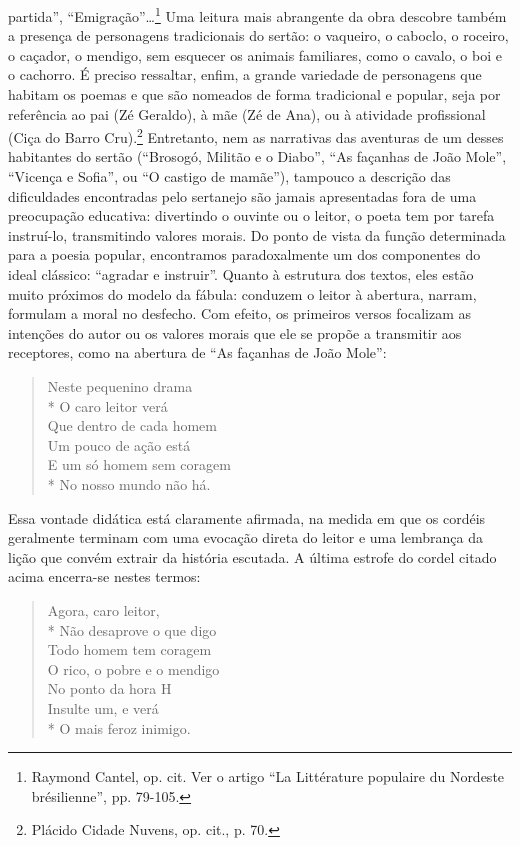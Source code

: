 partida”, “Emigração”\ldots{}\footnote{ Raymond Cantel, op. cit. Ver o artigo
“La Littérature populaire du Nordeste brésilienne”, pp. 79-105.} Uma
leitura mais abrangente da obra descobre também a presença de personagens
tradicionais do sertão: o vaqueiro, o caboclo, o roceiro, o caçador, o mendigo,
sem esquecer os animais familiares, como o cavalo, o boi e o cachorro. É preciso
ressaltar, enfim, a grande variedade de personagens que habitam os poemas e que
são nomeados de forma tradicional e popular, seja por referência ao pai (Zé
Geraldo), à mãe (Zé de Ana), ou à atividade profissional (Ciça do Barro
Cru).\footnote{ Plácido Cidade Nuvens, op. cit., p. 70.} Entretanto,
nem as narrativas das aventuras de um desses habitantes do sertão (“Brosogó,
Militão e o Diabo”, “As façanhas de João Mole”, “Vicença e Sofia”, ou “O castigo
de mamãe”), tampouco a descrição das dificuldades encontradas pelo sertanejo são
jamais apresentadas fora de uma preocupação educativa: divertindo o ouvinte ou o
leitor, o poeta tem por tarefa instruí-lo, transmitindo valores morais. Do ponto
de vista da função determinada para a poesia popular, encontramos paradoxalmente
um dos componentes do ideal clássico: “agradar e instruir”. Quanto à estrutura
dos textos, eles estão muito próximos do modelo da fábula: conduzem o leitor à
abertura, narram, formulam a moral no desfecho. Com efeito, os primeiros versos
focalizam as intenções do autor ou os valores morais que ele se propõe a
transmitir aos receptores, como na abertura de “As façanhas de João Mole”:

\begin{verse}
Neste pequenino drama\\*
O caro leitor verá\\
Que dentro de cada homem\\
Um pouco de ação está\\
E um só homem sem coragem\\*
No nosso mundo não há.
\end{verse}

Essa vontade didática está claramente afirmada, na medida em que os cordéis
geralmente terminam com uma evocação direta do leitor e uma lembrança da lição
que convém extrair da história escutada. A última estrofe do cordel citado
acima encerra-se nestes termos:

\begin{verse}
Agora, caro leitor,\\*
Não desaprove o que digo\\
Todo homem tem coragem\\
O rico, o pobre e o mendigo\\
No ponto da hora H\\
Insulte um, e verá\\*
O mais feroz inimigo.
\end{verse}


